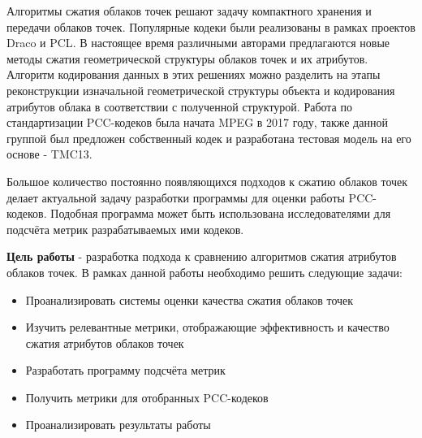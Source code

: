 Алгоритмы сжатия облаков точек решают задачу компактного хранения и передачи
облаков точек. Популярные кодеки были реализованы в рамках проектов
Draco\cite{Draco} и PCL\cite{Rusu_ICRA2011_PCL}. В настоящее время различными
авторами предлагаются новые методы сжатия геометрической структуры облаков
точек\cite{PCGCv2}\cite{GeoCNNv2} и их
атрибутов\cite{Shao2017}\cite{Chen2020}\cite{Sun2023}. Алгоритм кодирования
данных в этих решениях можно разделить на этапы реконструкции изначальной
геометрической структуры объекта и кодирования атрибутов облака в соответствии с
полученной структурой. Работа по стандартизации PCC-кодеков была начата MPEG в
2017 году\cite{CallForProposalV2}, также данной группой был предложен
собственный кодек и разработана тестовая модель на его основе -
TMC13\cite{TMC13}.

Большое количество постоянно появляющихся подходов к сжатию облаков точек делает
актуальной задачу разработки программы для оценки работы PCC-кодеков. Подобная
программа может быть использована исследователями для подсчёта метрик
разрабатываемых ими кодеков.

\textbf{Цель работы} - разработка подхода к сравнению алгоритмов сжатия
атрибутов облаков точек. В рамках данной работы необходимо решить следующие
задачи:

\begin{itemize}
    \item Проанализировать системы оценки качества сжатия облаков точек
    \item Изучить релевантные метрики, отображающие эффективность и качество
    сжатия атрибутов облаков точек
    \item Разработать программу подсчёта метрик
    \item Получить метрики для отобранных PCC-кодеков
    \item Проанализировать результаты работы
\end{itemize}



